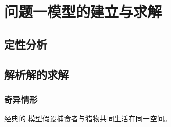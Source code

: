 \documentclass{MMCStyle}
\begin{document}
\clearpage
\appendix

\section{问题一模型的建立与求解}

\zhlipsum[1]

\subsection{定性分析}

\zhlipsum[1]

\subsection{解析解的求解}

\zhlipsum[10]

\subsubsection{奇异情形}

经典的  模型假设捕食者与猎物共同生活在同一空间。

\clearpage
{}
{}
% 
\printbibliography[title={参考文献}] %
\end{document}
